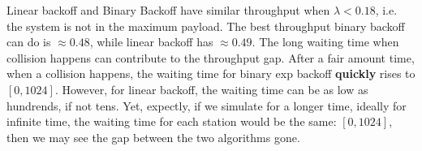 \documentclass{article}
\begin{document}
Linear backoff and Binary Backoff have similar throughput when $\lambda < 0.18$, i.e. the system is not in the maximum payload.
The best throughput binary backoff can do is $\approx 0.48$, while linear backoff has $\approx 0.49$.
The long waiting time when collision happens can contribute to the throughput gap.
After a fair amount time, when a collision happens, the waiting time for binary exp backoff \textbf{quickly} rises to $[0, 1024]$.
However, for linear backoff, the waiting time can be as low as hundrends, if not tens.
Yet, expectly, if we simulate for a longer time, ideally for infinite time, the waiting time for each station would be the same: $[0, 1024]$, then we may see the gap between the two algorithms gone.
\end{document}
